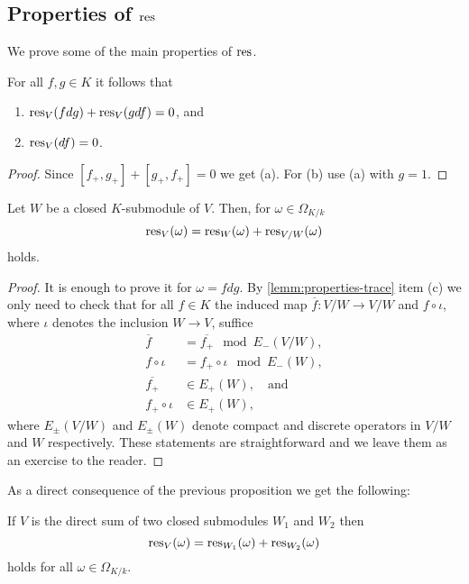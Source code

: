 \subsection*{Properties of $\operatorname{res}$}
We prove some of the main properties of $\operatorname{res}$.
\begin{proposition}\label{prop:linearity-residue}
	For all $f,g \in K$ it follows that
	\begin{enumerate}[label = (\alph*)]
		\item $\operatorname{res}_{V}(fdg) + \operatorname{res}_{V}(gdf) = 0$, and
		\item $\operatorname{res}_V(df) = 0$.
	\end{enumerate}
\end{proposition}
\begin{proof}
	Since $[f_{+}, g_{+}] + [g_{+}, f_{+}] = 0$ we get (a). For (b) use (a) with $g = 1$. 
\end{proof}
\begin{proposition}\label{prop:linearity-residue-closed-submodule}
	Let $W$ be a closed $K$-submodule of $V$. Then, for $\omega \in \Omega_{K/k}$
	\[
		\operatorname{res}_{V}(\omega) = \operatorname{res}_{W}(\omega) + \operatorname{res}_{V/W}(\omega)
	\]
	holds.
\end{proposition}
\begin{proof}
	It is enough to prove it for $\omega = f dg$. By \cref{lemm:properties-trace} item (c) we only need to check that for all $f \in K$ the induced map $\overline{f}\colon V/W \to V/W$ and $f \circ \iota$, where $\iota$ denotes the inclusion $W \to V$, suffice 
	\begin{align*}
	\overline{f} &= \overline{f_{+}} \mod E_{-}(V/W), \\
	f \circ \iota &= f_{+} \circ \iota \mod E_{-}(W), \\ 
	\overline{f_{+}}&\in E_{+}(W), \quad\text{and} \\
	f_{+} \circ \iota &\in E_{+}(W),
	\end{align*}
	where $E_{\pm}(V/W)$ and $E_{\pm}(W)$ denote compact and discrete operators in $V/W$ and $W$ respectively. These statements are straightforward and we leave them as an exercise to the reader.
\end{proof}
As a direct consequence of the previous proposition we get the following:
\begin{proposition}\label{prop:direct-sum-residue}
	If $V$ is the direct sum of two closed submodules $W_{1}$ and $W_{2}$ then 
	\[
		\operatorname{res}_{V}(\omega) = \operatorname{res}_{W_{1}}(\omega) + \operatorname{res}_{W_{2}}(\omega)
	\]
	holds for all $\omega \in \Omega_{K/k}$.
\end{proposition}
